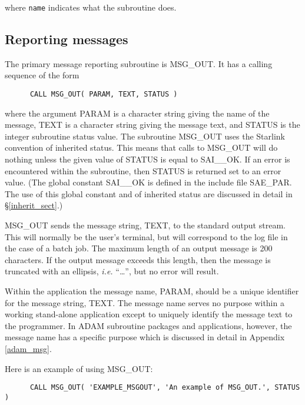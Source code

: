where {\tt name} indicates what the subroutine does.


\subsection {Reporting messages}

The primary message reporting subroutine is MSG\_OUT. 
It has a calling sequence of the form 

\begin {small}
\begin{verbatim}
      CALL MSG_OUT( PARAM, TEXT, STATUS )
\end{verbatim}
\end {small}

where the argument PARAM is a character string giving the name of the message,
TEXT is a character string giving the message text, and STATUS is the
integer subroutine status value. 
The subroutine MSG\_OUT uses the Starlink convention of inherited
status. 
This means that calls to MSG\_OUT will do nothing unless the given value of
STATUS is equal to SAI\_\_OK.
If an error is encountered within the subroutine, then STATUS is returned
set to an error value. 
(The global constant SAI\_\_OK is defined in the include file SAE\_PAR. 
The use of this global constant and of inherited status are discussed in detail
in \S\ref{inherit_sect}.) 

MSG\_OUT sends the message string, TEXT, to the standard output stream. 
This will normally be the user's terminal, but will correspond to the log file
in the case of a batch job.
The maximum length of an output message is 200 characters.
If the output message exceeds this length, then the message is truncated with
an ellipsis, {\em i.e.} ``\ldots'', but no error will result.

Within the application the message name, PARAM, should be a unique identifier 
for the message string, TEXT. 
The message name serves no purpose within a working stand-alone application
except to uniquely identify the message text to the programmer.
In ADAM subroutine packages and applications, however, the message name has
a specific purpose which is discussed in detail in Appendix \ref{adam_msg}.

Here is an example of using MSG\_OUT:

\begin {small}
\begin{verbatim}
      CALL MSG_OUT( 'EXAMPLE_MSGOUT', 'An example of MSG_OUT.', STATUS )
\end{verbatim}
\end {small}

